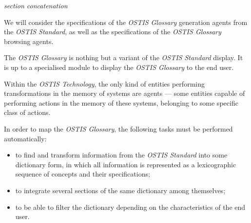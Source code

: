 \documentclass[12pt,a4paper]{scndocument}
\begin{document}
\begin{multicols}{2}
\begin{SCn}
         \begin{scnreltovector}{\textit{section concatenation}}
         \end{scnreltovector}
\end{SCn}

We will consider the specifications of the \textit{OSTIS Glossary} generation agents from the \textit{OSTIS Standard}, as well as the specifications of the \textit{OSTIS Glossary} browsing agents.




The \textit{OSTIS Glossary} is nothing but a variant of the \textit{OSTIS Standard} display. It is up to a specialised module to display the \textit{OSTIS Glossary} to the end user.

Within the \textit{OSTIS Technology}, the only kind of entities performing transformations in the memory of systems are agents — some entities capable of performing actions in the memory of these systems, belonging to some specific class of actions.

In order to map the \textit{OSTIS Glossary}, the following tasks must be performed automatically:
\begin{itemize}
\item to find and transform information from the \textit{OSTIS Standard} into some dictionary form, in which all information is represented as a lexicographic sequence of concepts and their specifications;
\item to integrate several sections of the same dictionary among themselves;
\item to be able to filter the dictionary depending on the characteristics of the end user.
\end{itemize}


\end{multicols}
\end{document}
